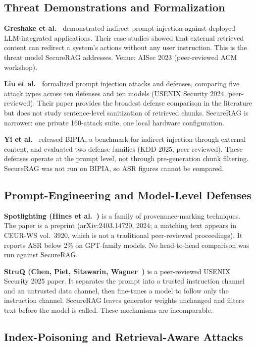 \documentclass[journal]{IEEEtran}
\begin{document}
\subsection{Threat Demonstrations and Formalization}

\textbf{Greshake et al.~\cite{greshake2023indirect}} demonstrated indirect
prompt injection against deployed LLM-integrated applications. Their case
studies showed that external retrieved content can redirect a system's actions
without any user instruction. This is the threat model SecureRAG addresses.
Venue: AISec 2023 (peer-reviewed ACM workshop).

\textbf{Liu et al.~\cite{liu2024formalizing}} formalized prompt injection attacks
and defenses, comparing five attack types across ten defenses and ten models
(USENIX Security 2024, peer-reviewed). Their paper provides the broadest defense
comparison in the literature but does not study sentence-level sanitization of
retrieved chunks. SecureRAG is narrower: one private 160-attack suite, one local
hardware configuration.

\textbf{Yi et al.~\cite{yi2025bipia}} released BIPIA, a benchmark for indirect
injection through external content, and evaluated two defense families (KDD 2025,
peer-reviewed). These defenses operate at the prompt level, not through
pre-generation chunk filtering. SecureRAG was not run on BIPIA, so ASR figures
cannot be compared.

\subsection{Prompt-Engineering and Model-Level Defenses}

\textbf{Spotlighting (Hines et al.~\cite{hines2024spotlighting})} is a family of
provenance-marking techniques. The paper is a preprint (arXiv:2403.14720, 2024;
a matching text appears in CEUR-WS vol.~3920, which is not a traditional
peer-reviewed proceedings). It reports ASR below 2\% on GPT-family models. No
head-to-head comparison was run against SecureRAG.

\textbf{StruQ (Chen, Piet, Sitawarin, Wagner~\cite{chen2025struq})} is a
peer-reviewed USENIX Security 2025 paper. It separates the prompt into a trusted
instruction channel and an untrusted data channel, then fine-tunes a model to
follow only the instruction channel. SecureRAG leaves generator weights unchanged
and filters text before the model is called. These mechanisms are incomparable.

\subsection{Index-Poisoning and Retrieval-Aware Attacks}
\end{document}
